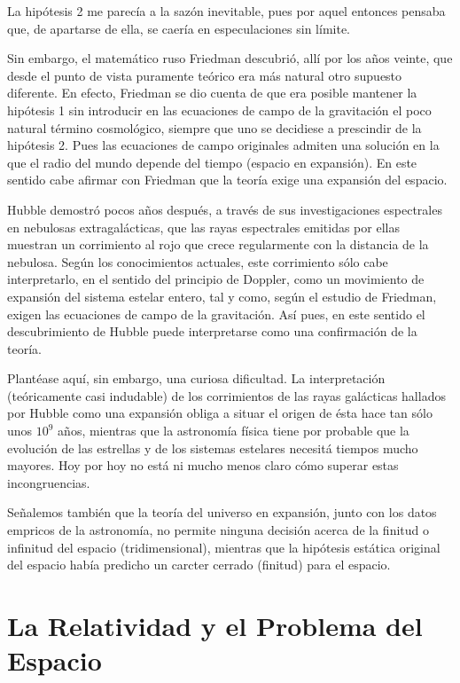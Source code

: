 \documentclass[spanish]{book}
\begin{document}
La hipótesis 2 me parecía a la sazón inevitable, pues por aquel entonces pensaba que,
de apartarse de ella, se caería en especulaciones sin límite.

Sin embargo, el matemático ruso Friedman descubrió, allí por los años veinte, que
desde el punto de vista puramente teórico era más natural otro supuesto diferente. En
efecto, Friedman se dio cuenta de que era posible mantener la hipótesis 1 sin
introducir en las ecuaciones de campo de la gravitación el poco natural término
cosmológico, siempre que uno se decidiese a prescindir de la hipótesis 2. Pues las
ecuaciones de campo originales admiten una solución en la que el radio del mundo
depende del tiempo (espacio en expansión). En este sentido cabe afirmar con Friedman
que la teoría exige una expansión del espacio.

Hubble demostró pocos años después, a través de sus investigaciones espectrales
en nebulosas extragalácticas, que las rayas espectrales emitidas por ellas muestran un
corrimiento al rojo que crece regularmente con la distancia de la nebulosa. Según los
conocimientos actuales, este corrimiento sólo cabe interpretarlo, en el sentido del
principio de Doppler, como un movimiento de expansión del sistema estelar entero,
tal y como, según el estudio de Friedman, exigen las ecuaciones de campo de la
gravitación. Así pues, en este sentido el descubrimiento de Hubble puede interpretarse
como una confirmación de la teoría.

Plantéase aquí, sin embargo, una curiosa dificultad. La interpretación (teóricamente
casi indudable) de los corrimientos de las rayas galácticas hallados por Hubble como
una expansión obliga a situar el origen de ésta hace tan sólo unos $10^{9}$ años,
mientras que la astronomía física tiene por probable que la evolución de las estrellas
y de los sistemas estelares necesitá tiempos mucho mayores. Hoy por hoy no está ni
mucho menos claro cómo superar estas incongruencias.

Señalemos también que la teoría del universo en expansión, junto con los datos
empricos de la astronomía, no permite ninguna decisión acerca de la finitud o
infinitud del espacio (tridimensional), mientras que la hipótesis estática original del
espacio había predicho un carcter cerrado (finitud) para el espacio.


\chapter{La Relatividad y el Problema del Espacio}
\end{document}
